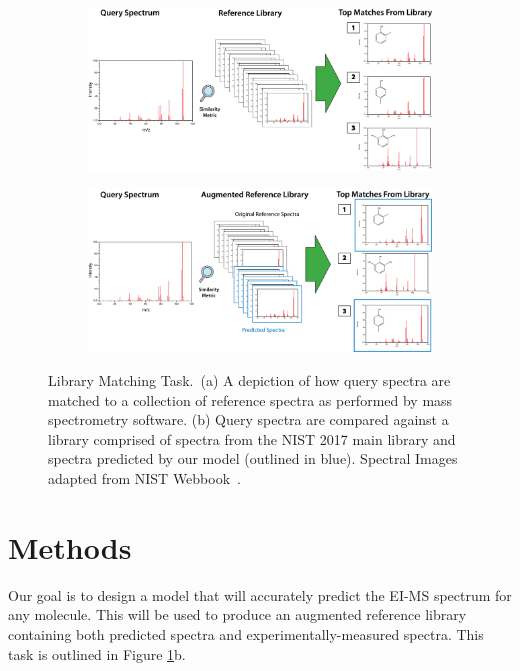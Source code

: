 \begin{figure}[t]
    \centering
    \begin{subfigure}{0.9\textwidth}
        \includegraphics[width=\textwidth]{./lib_match_baseline.png}
        \caption{}
    \end{subfigure}
    \begin{subfigure}{0.9\textwidth}
        \includegraphics[width=\textwidth]{./lib_match_predicted.png}
        \caption{}
    \end{subfigure}
    \caption[Library Matching Task]{Library Matching Task.~(a) A depiction of how query spectra are matched to a collection of reference spectra as performed by mass spectrometry software. (b) Query spectra are compared against a library comprised of spectra from the NIST 2017 main library and spectra predicted by our model (outlined in blue).  Spectral Images adapted from NIST Webbook~\cite{NIST_WebBook}.}
    \label{fig:library_matching}
\end{figure}

\section{Methods}


Our goal is to design a model that will accurately predict the EI-MS spectrum for any molecule. This will be used to produce an augmented reference library containing both predicted spectra and experimentally-measured spectra.  This task is outlined in Figure \ref{fig:library_matching}b.

